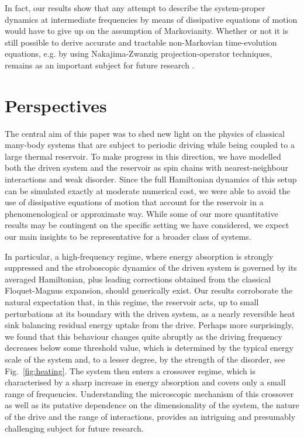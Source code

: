 \documentclass[aps,pre,twocolumn,notitlepage,floats,10pt]{revtex4-1}
\begin{document}
In fact, our results show that any attempt to describe the system-proper
dynamics at intermediate frequencies by means of dissipative equations of
motion would have to give up on the assumption of Markovianity.
Whether or not it is still possible to derive accurate and tractable
non-Markovian time-evolution equations, e.g. by using Nakajima-Zwanzig
projection-operator techniques, remains as an important subject for future
research \cite{Nakajima,Zwanzig,Breuer}.

\section{Perspectives}
The central aim of this paper was to shed new light on the physics of classical
many-body systems that are subject to periodic driving while being coupled to a
large thermal reservoir. 
To make progress in this direction, we have modelled both the driven system and
the reservoir as spin chains with nearest-neighbour interactions and weak
disorder. 
Since the full Hamiltonian dynamics of this setup can be simulated exactly at
moderate numerical cost, we were able to avoid the use of dissipative equations
of motion that account for the reservoir in a phenomenological or approximate
way. 
While some of our more quantitative results may be contingent on the specific
setting we have considered, we expect our main insights to be representative for
a broader class of systems.

In particular, a high-frequency regime, where energy absorption is strongly
suppressed and the stroboscopic dynamics of the driven system is governed by its
averaged Hamiltonian, plus leading corrections obtained from the
classical Floquet-Magnus expansion, should generically exist. 
Our results corroborate the natural expectation that, in this regime, the
reservoir acts, up to small perturbations at its boundary with the driven
system, as a nearly reversible heat sink balancing residual energy uptake from
the drive. 
Perhaps more surprisingly, we found that this behaviour changes quite abruptly as
the driving frequency decreases below some threshold value, which is determined
by the typical energy scale of the system and, to a lesser degree, by the
strength of the disorder, see Fig.~\ref{fig:heating}. 
The system then enters a crossover regime, which is characterised by a sharp
increase in energy absorption and covers only a small range of frequencies. 
Understanding the microscopic mechanism of this crossover as well as its
putative dependence on the dimensionality of the system, the nature of the drive
and the range of interactions, provides an intriguing and presumably challenging
subject for future research.
\end{document}
